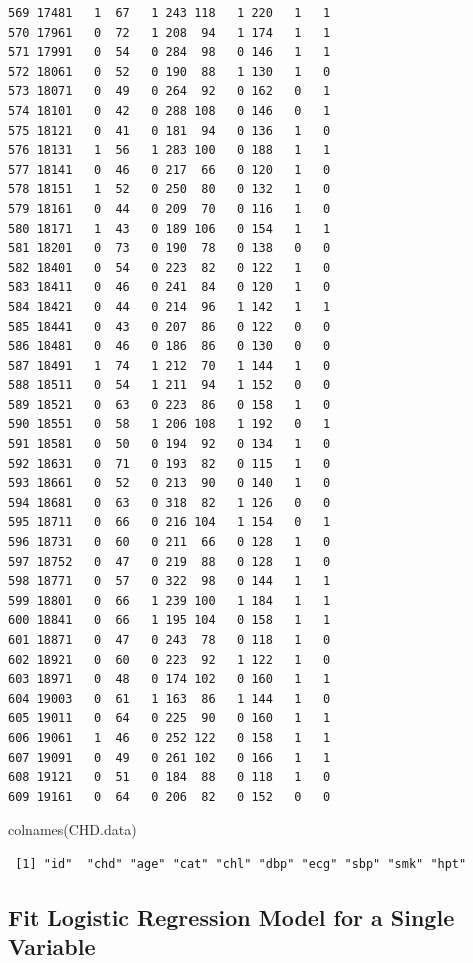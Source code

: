 \documentclass[
  letterpaper,
]{scrbook}
\newenvironment{Shaded}{\begin{snugshade}}{\end{snugshade}}
\newcommand{\FunctionTok}[1]{\textcolor[rgb]{0.28,0.35,0.67}{#1}}
\newcommand{\NormalTok}[1]{\textcolor[rgb]{0.00,0.23,0.31}{#1}}
\begin{document}
\begin{verbatim}
569 17481   1  67   1 243 118   1 220   1   1
570 17961   0  72   1 208  94   1 174   1   1
571 17991   0  54   0 284  98   0 146   1   1
572 18061   0  52   0 190  88   1 130   1   0
573 18071   0  49   0 264  92   0 162   0   1
574 18101   0  42   0 288 108   0 146   0   1
575 18121   0  41   0 181  94   0 136   1   0
576 18131   1  56   1 283 100   0 188   1   1
577 18141   0  46   0 217  66   0 120   1   0
578 18151   1  52   0 250  80   0 132   1   0
579 18161   0  44   0 209  70   0 116   1   0
580 18171   1  43   0 189 106   0 154   1   1
581 18201   0  73   0 190  78   0 138   0   0
582 18401   0  54   0 223  82   0 122   1   0
583 18411   0  46   0 241  84   0 120   1   0
584 18421   0  44   0 214  96   1 142   1   1
585 18441   0  43   0 207  86   0 122   0   0
586 18481   0  46   0 186  86   0 130   0   0
587 18491   1  74   1 212  70   1 144   1   0
588 18511   0  54   1 211  94   1 152   0   0
589 18521   0  63   0 223  86   0 158   1   0
590 18551   0  58   1 206 108   1 192   0   1
591 18581   0  50   0 194  92   0 134   1   0
592 18631   0  71   0 193  82   0 115   1   0
593 18661   0  52   0 213  90   0 140   1   0
594 18681   0  63   0 318  82   1 126   0   0
595 18711   0  66   0 216 104   1 154   0   1
596 18731   0  60   0 211  66   0 128   1   0
597 18752   0  47   0 219  88   0 128   1   0
598 18771   0  57   0 322  98   0 144   1   1
599 18801   0  66   1 239 100   1 184   1   1
600 18841   0  66   1 195 104   0 158   1   1
601 18871   0  47   0 243  78   0 118   1   0
602 18921   0  60   0 223  92   1 122   1   0
603 18971   0  48   0 174 102   0 160   1   1
604 19003   0  61   1 163  86   1 144   1   0
605 19011   0  64   0 225  90   0 160   1   1
606 19061   1  46   0 252 122   0 158   1   1
607 19091   0  49   0 261 102   0 166   1   1
608 19121   0  51   0 184  88   0 118   1   0
609 19161   0  64   0 206  82   0 152   0   0
\end{verbatim}

\begin{Shaded}
\begin{Highlighting}[]
\FunctionTok{colnames}\NormalTok{(CHD.data)}
\end{Highlighting}
\end{Shaded}

\begin{verbatim}
 [1] "id"  "chd" "age" "cat" "chl" "dbp" "ecg" "sbp" "smk" "hpt"
\end{verbatim}

\subsection{Fit Logistic Regression Model for a Single
Variable}\label{fit-logistic-regression-model-for-a-single-variable}
\end{document}
